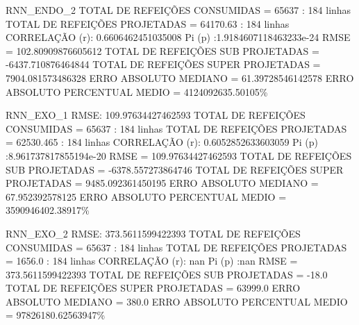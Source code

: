 \documentclass[	12pt, Times, openright, twoside, a4paper, english, brazil]{abntex2}
\begin{document}
            RNN\_ENDO\_2\newline
            TOTAL DE REFEIÇÕES CONSUMIDAS = 65637 : 184 linhas\newline
            TOTAL DE REFEIÇÕES PROJETADAS = 64170.63 : 184 linhas\newline
            CORRELAÇÃO (r): 0.6606462451035008 Pi (p) :1.9184607118463233e-24\newline
            RMSE = 102.80909876605612\newline
            TOTAL DE REFEIÇÕES SUB PROJETADAS = -6437.710876464844\newline
            TOTAL DE REFEIÇÕES SUPER PROJETADAS = 7904.081573486328\newline
            ERRO ABSOLUTO MEDIANO = 61.39728546142578\newline
            ERRO ABSOLUTO PERCENTUAL MEDIO = 4124092635.50105\% \newline
            
            RNN\_EXO\_1\newline
            RMSE:  109.97634427462593\newline
            TOTAL DE REFEIÇÕES CONSUMIDAS = 65637 : 184 linhas\newline
            TOTAL DE REFEIÇÕES PROJETADAS = 62530.465 : 184 linhas\newline
            CORRELAÇÃO (r): 0.6052852633603059 Pi (p) :8.961737817855194e-20\newline
            RMSE = 109.97634427462593\newline
            TOTAL DE REFEIÇÕES SUB PROJETADAS = -6378.557273864746\newline
            TOTAL DE REFEIÇÕES SUPER PROJETADAS = 9485.092361450195\newline
            ERRO ABSOLUTO MEDIANO = 67.952392578125\newline
            ERRO ABSOLUTO PERCENTUAL MEDIO = 3590946402.38917\% \newline
            
            RNN\_EXO\_2\newline
            RMSE:  373.5611599422393\newline
            TOTAL DE REFEIÇÕES CONSUMIDAS = 65637 : 184 linhas\newline
            TOTAL DE REFEIÇÕES PROJETADAS = 1656.0 : 184 linhas\newline
            CORRELAÇÃO (r): nan Pi (p) :nan\newline
            RMSE = 373.5611599422393\newline
            TOTAL DE REFEIÇÕES SUB PROJETADAS = -18.0\newline
            TOTAL DE REFEIÇÕES SUPER PROJETADAS = 63999.0\newline
            ERRO ABSOLUTO MEDIANO = 380.0\newline
            ERRO ABSOLUTO PERCENTUAL MEDIO = 97826180.62563947\% \newline
            
\end{document}
